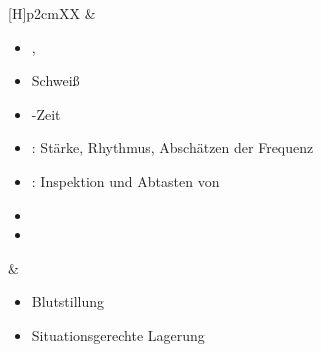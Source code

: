 {\begin{minipage}[t]{\linewidth -
{2\fboxrule} - {2\fboxsep}}
\begin{minipage}[t]{\linewidth}
{\begin{tabularx}{\linewidth}[H]{p{2cm}XX}
&
\begin{minipage}[t]{\linewidth}
\begin{itemize}
  \item {}, 
  \item Schweiß
  \item {}-Zeit
  \item {}: Stärke, Rhythmus, Abschätzen der
  Frequenz
  \item {}: Inspektion
  und Abtasten von
  \item {}
  \item {}
\end{itemize}
\end{minipage}
&
\noindent\color{DefaultA}\itshape\begin{minipage}[t]{\linewidth}
\begin{itemize}
  \item Blutstillung
  \item Situationsgerechte Lagerung
\end{itemize}
\end{minipage}
\\\addlinespace\midrule\addlinespace
\noindent{}\vspace{\baselineskip}


\end{tabularx}}
\end{minipage}
\end{minipage}}
